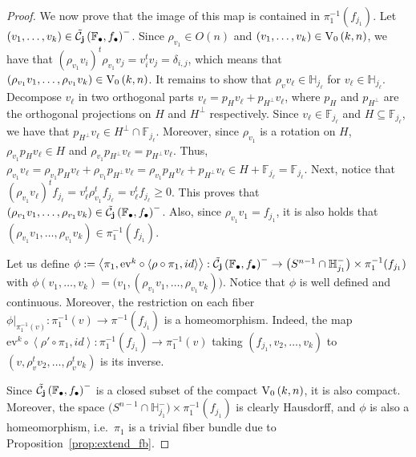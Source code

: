 \begin{proof}
We now prove that the image of this map is contained in $\pi_1^{-1}(f_{j_1})$. Let $(v_1,\ldots,v_k)\in\tilde{\mathcal{C}}_{\mathbf{j}}\left(\mathbb{F}_{\bullet},f_{\bullet}\right)^-$. Since $\rho_{v_1}\in O(n)$ and $(v_1,\ldots,v_k)\in\StO{k}{n}$, we have that $(\rho_{v_1}v_i)^t\rho_{v_1}v_j=v_i^tv_j=\delta_{i,j}$, which means that $(\rho_{v_1}v_1,\ldots,\rho_{v_1}v_k)\in\StO{k}{n}$. It remains to show that $\rho_vv_{\ell}\in\mathbb{H}_{j_{\ell}}$ for $v_{\ell}\in\mathbb{H}_{j_{\ell}}$. Decompose $v_{\ell}$ in two orthogonal parts $v_{\ell}=p_Hv_{\ell}+p_{H^{\perp}}v_{\ell}$, where $p_H$ and $p_{H^{\perp}}$ are the orthogonal projections on $H$ and $H^{\perp}$ respectively. Since $v_{\ell}\in\mathbb{F}_{j_{\ell}}$ and $H\subseteq\mathbb{F}_{j_{\ell}}$, we have that $p_{H^{\perp}}v_{\ell}\in H^{\perp}\cap\mathbb{F}_{j_{\ell}}$. Moreover, since $\rho_{v_1}$ is a rotation on $H$, $\rho_{v_1}p_Hv_{\ell}\in H$ and $\rho_{v_1}p_{H^{\perp}}v_{\ell}=p_{H^{\perp}}v_{\ell}$. Thus, $\rho_{v_1}v_{\ell}=\rho_{v_1}p_Hv_{\ell}+\rho_{v_1}p_{H^{\perp}}v_{\ell}=\rho_{v_1}p_Hv_{\ell}+p_{H^{\perp}}v_{\ell}\in H+\mathbb{F}_{j_{\ell}}=\mathbb{F}_{j_{\ell}}$. Next, notice that $(\rho_{v_1}v_{\ell})^tf_{j_{\ell}}=v_{\ell}^t\rho_{v_1}^tf_{j_{\ell}}=v_{\ell}^tf_{j_{\ell}}\geq0$. This proves that $(\rho_{v_1}v_1,\ldots,\rho_{v_1}v_k)\in\tilde{\mathcal{C}}_{\mathbf{j}}\left(\mathbb{F}_{\bullet},f_{\bullet}\right)^-$. Also, since $\rho_{v_1}v_1=f_{j_1}$, it is also holds that $(\rho_{v_1}v_1,\ldots,\rho_{v_1}v_k)\in\pi_1^{-1}(f_{j_1})$.

Let us define $\phi:=\left<\pi_1,\mathrm{ev}^k\circ\left<\rho\circ\pi_1,id\right>\right>:\tilde{\mathcal{C}}_{\mathbf{j}}\left(\mathbb{F}_{\bullet},f_{\bullet}\right)^-\to\big(S^{n-1}\cap\mathbb{H}_{j_1}^-\big)\times\pi_1^{-1}(f_{j_1})$ with $\phi(v_1,\ldots,v_k)=\big(v_1,(\rho_{v_1}v_1,\ldots,\rho_{v_1}v_k)\big)$. Notice that $\phi$ is well defined and continuous. Moreover, the restriction on each fiber $\phi|_{\pi_1^{-1}(v)}:\pi_1^{-1}(v)\to\pi^{-1}(f_{j_1})$ is a homeomorphism. Indeed, the map $\mathrm{ev}^k\circ\left<\rho'\circ\pi_1{,}id\right>:\pi_1^{-1}(f_{j_1})\to\pi_1^{-1}(v)$ taking $(f_{j_1},v_2,\ldots,v_k)$ to $(v,\rho_v^tv_2,\ldots,\rho_v^tv_k)$ is its inverse.

Since $\tilde{\mathcal{C}}_{\mathbf{j}}\left(\mathbb{F}_{\bullet},f_{\bullet}\right)^-$ is a closed subset of the compact $\StO{k}{n}$, it is also compact. Moreover, the space $\big(S^{n-1}\cap\mathbb{H}_{j_1}^-\big)\times\pi_1^{-1}(f_{j_1})$ is clearly Hausdorff, and $\phi$ is also a homeomorphism, i.e.\ $\pi_1$ is a trivial fiber bundle due to Proposition~\ref{prop:extend_fb}.
\end{proof}

